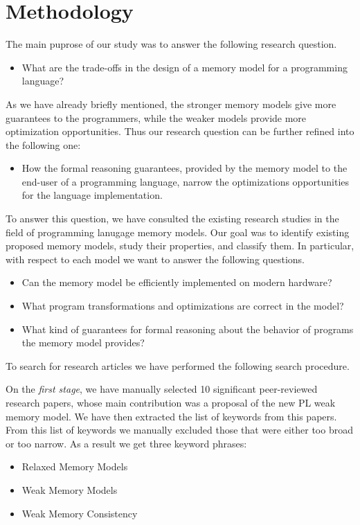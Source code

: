 \section{Methodology}

The main puprose of our study was to answer the following research question.

\begin{itemize}
  \item What are the trade-offs in the design of a memory model for a programming language?
\end{itemize}

As we have already briefly mentioned, the stronger memory models 
give more guarantees to the programmers, while the weaker models 
provide more optimization opportunities. 
Thus our research question can be further refined into the following one:

\begin{itemize}
  \item How the formal reasoning guarantees, provided by the memory model 
    to the end-user of a programming language, narrow the 
    optimizations opportunities for the language implementation. 
\end{itemize}

To answer this question, we have consulted the existing research studies 
in the field of programming lanugage memory models.
Our goal was to identify existing proposed memory models, 
study their properties, and classify them.
In particular, with respect to each model we want to answer the following questions.

\begin{itemize}
  
  \item Can the memory model be efficiently implemented on modern hardware? 

  \item What program transformations and optimizations are correct in the model? 

  \item What kind of guarantees for formal reasoning about the behavior 
    of programs the memory model provides?
  
\end{itemize}

To search for research articles we have performed the following search procedure.

On the \emph{first stage}, we have manually selected 10 significant 
peer-reviewed research papers, whose main contribution 
was a proposal of the new PL weak memory model.
We have then extracted the list of keywords from this papers. 
From this list of keywords we manually excluded those 
that were either too broad or too narrow.
As a result we get three keyword phrases:
\begin{itemize}
  \item Relaxed Memory Models
  \item Weak Memory Models
  \item Weak Memory Consistency
\end{itemize}
 

